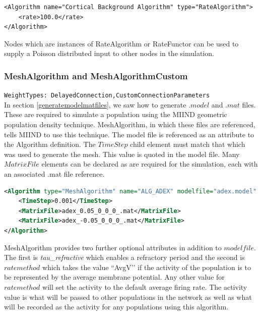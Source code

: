 \documentclass[utf8]{frontiersSCNS} %
\begin{document}
\begin{lstlisting}[caption={RateAlgorithm is used to supply a constant average firing rate without the ability to be time dependent.}]
<Algorithm name="Cortical Background Algorithm" type="RateAlgorithm">
	<rate>100.0</rate>
</Algorithm>
\end{lstlisting}

Nodes which are instances of RateAlgorithm or RateFunctor can be used to supply a Poisson distributed input to other nodes in the simulation.\\

\subsubsection{MeshAlgorithm and MeshAlgorithmCustom}

\texttt{WeightTypes: DelayedConnection,CustomConnectionParameters}\\

In section \ref{generatemodelmatfiles}, we saw how to generate $.model$ and $.mat$ files. These are required to simulate a population using the MIIND geometric population density technique. MeshAlgorithm, in which these files are referenced, tells MIIND to use this technique. The model file is referenced as an attribute to the Algorithm definition. The $TimeStep$ child element must match that which was used to generate the mesh. This value is quoted in the model file. Many $MatrixFile$ elements can be declared as are required for the simulation, each with an associated .mat file reference.

\begin{lstlisting}[language=xml]
<Algorithm type="MeshAlgorithm" name="ALG_ADEX" modelfile="adex.model" >
	<TimeStep>0.001</TimeStep>
	<MatrixFile>adex_0.05_0_0_0_.mat</MatrixFile>
	<MatrixFile>adex_-0.05_0_0_0_.mat</MatrixFile>
</Algorithm>
\end{lstlisting}

MeshAlgorithm provides two further optional attributes in addition to $modelfile$. The first is \textit{tau\_refractive} which enables a refractory period and the second is $ratemethod$ which takes the value ``AvgV’’ if the activity of the population is to be represented by the average membrane potential. Any other value for $ratemethod$ will set the activity to the default average firing rate. The activity value is what will be passed to other populations in the network as well as what will be recorded as the activity for any populations using this algorithm.
\end{document}
